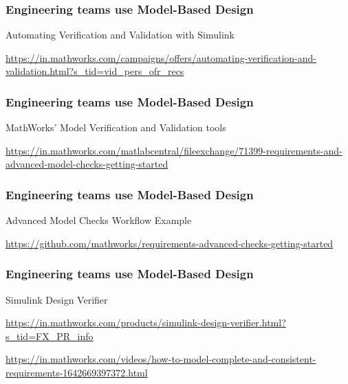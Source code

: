 \newpage 

\begin{frame}
\frametitle{Engineering teams use Model-Based Design }
\begin{block}{ Automating Verification and Validation with Simulink}

\url{https://in.mathworks.com/campaigns/offers/automating-verification-and-validation.html?s_tid=vid_pers_ofr_recs}

\end{block}
\end{frame}


\newpage 

\begin{frame}
\frametitle{Engineering teams use Model-Based Design }
\begin{block}{ MathWorks' Model Verification  and Validation tools}

\url{https://in.mathworks.com/matlabcentral/fileexchange/71399-requirements-and-advanced-model-checks-getting-started}
\end{block}
\end{frame}


\newpage 

\begin{frame}
\frametitle{Engineering teams use Model-Based Design }
\begin{block}{ Advanced Model Checks Workflow Example}

\url{https://github.com/mathworks/requirements-advanced-checks-getting-started}

\end{block}
\end{frame}


\newpage 

\begin{frame}
\frametitle{Engineering teams use Model-Based Design }
\begin{block}{Simulink Design Verifier}

\url{https://in.mathworks.com/products/simulink-design-verifier.html?s_tid=FX_PR_info}

\url{https://in.mathworks.com/videos/how-to-model-complete-and-consistent-requirements-1642669397372.html}

\end{block}
\end{frame}